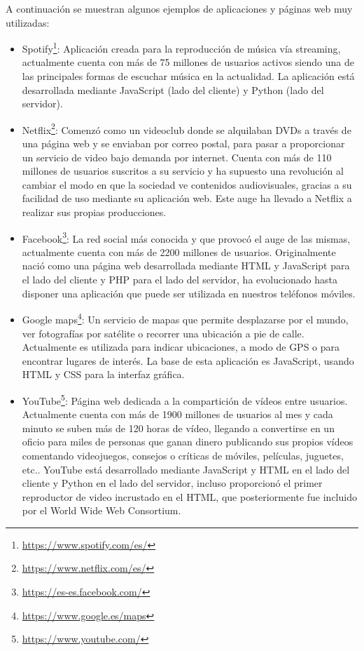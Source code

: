 A continuación se muestran algunos ejemplos de aplicaciones y páginas web muy utilizadas:
\begin{itemize}
\item Spotify\footnote{\url{https://www.spotify.com/es/}}: Aplicación creada para la reproducción de música vía streaming, actualmente cuenta con más de 75 millones de usuarios activos siendo una de las principales formas de escuchar música en la actualidad. La aplicación está desarrollada mediante JavaScript (lado del cliente) y Python (lado del servidor).
\item Netflix\footnote{\url{https://www.netflix.com/es/}}: Comenzó como un videoclub donde se alquilaban DVDs a través de una página web y se enviaban por correo postal, para pasar a proporcionar un servicio de video bajo demanda por internet. Cuenta con más de 110 millones de usuarios suscritos a su servicio y ha supuesto una revolución al cambiar el modo en que la sociedad ve contenidos audiovisuales, gracias a su facilidad de uso mediante su aplicación web. Este auge ha llevado a Netflix a realizar sus propias producciones. 
\item Facebook\footnote{\url{https://es-es.facebook.com/}}: La red social más conocida y que provocó el auge de las mismas, actualmente cuenta con más de 2200 millones de usuarios. Originalmente nació como una página web desarrollada mediante HTML y JavaScript para el lado del cliente y PHP para el lado del servidor, ha evolucionado hasta disponer una aplicación que puede ser utilizada en nuestros teléfonos móviles.
\item Google maps\footnote{\url{https://www.google.es/maps}}: Un servicio de mapas que permite desplazarse por el mundo, ver fotografías por satélite o recorrer una ubicación a pie de calle. Actualmente es utilizada para indicar ubicaciones, a modo de GPS o para encontrar lugares de interés. La base de esta aplicación es JavaScript, usando HTML y CSS para la interfaz gráfica.
\item YouTube\footnote{\url{https://www.youtube.com/}}: Página web dedicada a la compartición de vídeos entre usuarios. Actualmente cuenta con más de 1900 millones de usuarios al mes y cada minuto se suben más de 120 horas de vídeo, llegando a convertirse en un oficio para miles de personas que ganan dinero publicando sus propios vídeos comentando videojuegos, consejos o críticas de móviles, películas, juguetes, etc.. YouTube está desarrollado mediante JavaScript y HTML en el lado del cliente y Python en el lado del servidor, incluso proporcionó el primer reproductor de video incrustado en el HTML, que posteriormente fue incluido por el World Wide Web Consortium.

\end{itemize}

